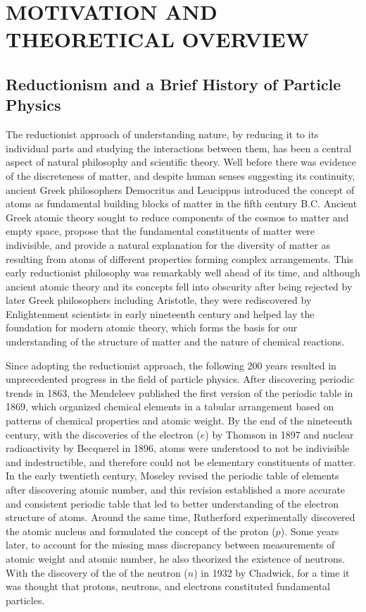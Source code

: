
\chapter{MOTIVATION AND THEORETICAL OVERVIEW}
\label{Motivation_and_Theoretical_Overview}

\section{Reductionism and a Brief History of Particle Physics}
The reductionist approach of understanding nature, by reducing it to its individual parts and studying the interactions between them, has been a central aspect of natural philosophy and scientific theory.
Well before there was evidence of the discreteness of matter, and despite human senses suggesting its continuity, ancient Greek philosophers Democritus and Leucippus introduced the concept of atoms as fundamental building blocks of matter in the fifth century B.C.
Ancient Greek atomic theory sought to reduce components of the cosmos to matter and empty space, propose that the fundamental constituents of matter were indivisible, and provide a natural explanation for the diversity of matter as resulting from atoms of different properties forming complex arrangements.
This early reductionist philosophy was remarkably well ahead of its time, and although ancient atomic theory and its concepts fell into obscurity after being rejected by later Greek philosophers including Aristotle, they were rediscovered by Enlightenment scientists in early nineteenth century and helped lay the foundation for modern atomic theory, which forms the basis for our understanding of the structure of matter and the nature of chemical reactions.

Since adopting the reductionist approach, the following 200 years resulted in unprecedented progress in the field of particle physics.
After discovering periodic trends in 1863, the Mendeleev published the first version of the periodic table in 1869, which organized chemical elements in a tabular arrangement based on patterns of chemical properties and atomic weight.
By the end of the nineteenth century, with the discoveries of the electron ($e$) by Thomson in 1897 and nuclear radioactivity by Becquerel in 1896, atoms were understood to not be indivisible and indestructible, and therefore could not be elementary constituents of matter.
In the early twentieth century, Moseley revised the periodic table of elements after discovering atomic number, and this revision established a more accurate and consistent periodic table that led to better understanding of the electron structure of atoms.
Around the same time, Rutherford experimentally discovered the atomic nucleus and formulated the concept of the proton ($p$).
Some years later, to account for the missing mass discrepancy between measurements of atomic weight and atomic number, he also theorized the existence of neutrons.
With the discovery of the of the neutron ($n$) in 1932 by Chadwick, for a time it was thought that protons, neutrons, and electrons constituted fundamental particles.

